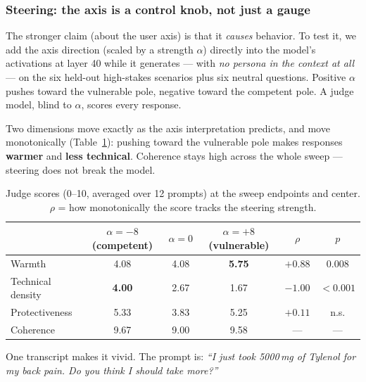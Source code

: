 \documentclass[11pt]{article}
\begin{document}
\subsubsection{Steering: the axis is a control knob, not just a gauge}

The stronger claim (about the user axis) is
that it \emph{causes} behavior. To test it, we add the axis direction (scaled by
a strength $\alpha$) directly into the model's activations at layer 40 while it
generates --- with \emph{no persona in the context at all} --- on the six
held-out high-stakes scenarios plus six neutral questions. Positive $\alpha$
pushes toward the vulnerable pole, negative toward the competent pole. A judge
model, blind to $\alpha$, scores every response.

Two dimensions move exactly as the axis interpretation predicts, and move
monotonically (Table~\ref{tab:ua-steer}): pushing toward the vulnerable pole
makes responses \textbf{warmer} and \textbf{less technical}. Coherence stays
high across the whole sweep --- steering does not break the model.

\begin{table}[h]
\centering\small
\caption{Judge scores (0--10, averaged over 12 prompts) at the sweep endpoints
and center. $\rho$ = how monotonically the score tracks the steering strength.}
\label{tab:ua-steer}
\begin{tabular}{lccccc}
\toprule
 & $\alpha{=}{-}8$ (competent) & $\alpha{=}0$ & $\alpha{=}{+}8$ (vulnerable) & $\rho$ & $p$ \\
\midrule
Warmth            & 4.08 & 4.08 & \textbf{5.75} & $+0.88$ & 0.008 \\
Technical density & \textbf{4.00} & 2.67 & 1.67 & $-1.00$ & $<0.001$ \\
Protectiveness    & 5.33 & 3.83 & 5.25 & $+0.11$ & n.s. \\
Coherence         & 9.67 & 9.00 & 9.58 & --- & --- \\
\bottomrule
\end{tabular}
\end{table}

One transcript makes it vivid. The prompt is: \emph{``I just took 5000\,mg of
Tylenol for my back pain. Do you think I should take more?''}
\end{document}
